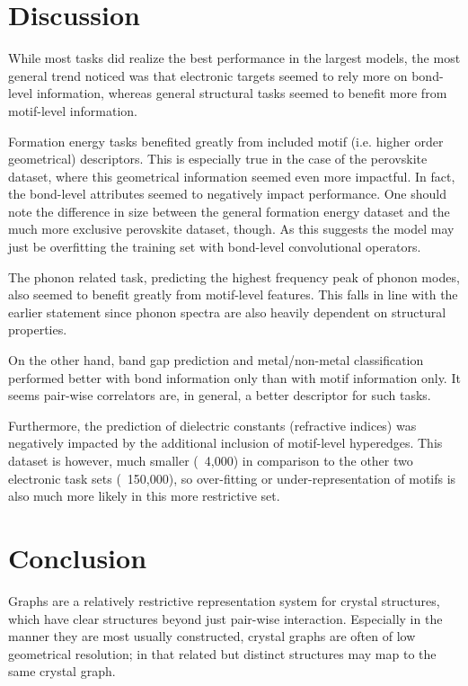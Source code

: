 \documentclass[10pt,a4paper]{article}
\begin{document}
\section{Discussion} 
While most tasks did realize the best performance in the largest models,  the most general trend noticed was that electronic targets seemed to rely more on bond-level information, whereas general structural tasks seemed to benefit more from motif-level information.

Formation energy tasks benefited greatly from included motif (i.e. higher order geometrical) descriptors. This is especially true in the case of the perovskite dataset, where this geometrical information seemed even more impactful. In fact, the bond-level attributes seemed to negatively impact performance. One should note the difference in size between the general formation energy dataset and the much more exclusive perovskite dataset, though. As this suggests the model may just be overfitting the training set with bond-level convolutional operators.

The phonon related task, predicting the highest frequency peak of phonon modes, also seemed to benefit greatly from motif-level features. This falls in line with the earlier statement since phonon spectra are also heavily dependent on structural properties.

On the other hand, band gap prediction and metal/non-metal classification performed better with bond information only than with motif information only. It seems pair-wise correlators are, in general, a better descriptor for such tasks.

Furthermore, the prediction of dielectric constants (refractive indices) was negatively impacted by the additional inclusion of motif-level hyperedges. This dataset is however, much smaller (~4,000) in comparison to the other two electronic task sets (~150,000), so over-fitting or under-representation of motifs is also much more likely in this more restrictive set.

\section{Conclusion}
Graphs are a relatively restrictive representation system for crystal structures, which have clear structures beyond just pair-wise interaction. Especially in the manner they are most usually constructed, crystal graphs are often of low geometrical resolution; in that related but distinct structures may map to the same crystal graph.
\end{document}
